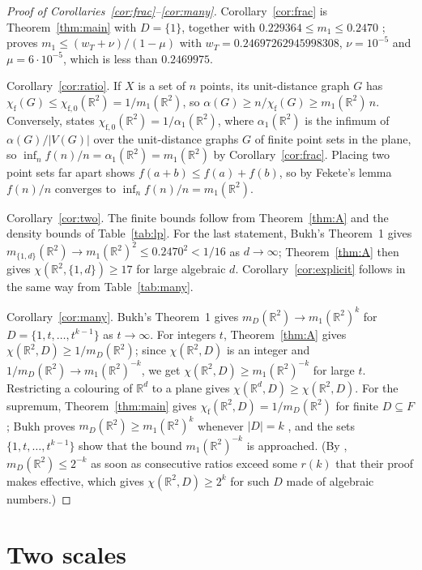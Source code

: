 \documentclass[11pt,a4paper]{amsart}
\theoremstyle{definition}
\theoremstyle{remark}
\newcommand{\R}{\mathbb{R}}
\newcommand{\chif}{\chi_{\mathrm f}}
\begin{document}
\begin{proof}[Proof of Corollaries~\ref{cor:frac}--\ref{cor:many}]
Corollary~\ref{cor:frac} is Theorem~\ref{thm:main} with $D=\{1\}$, together with $0.229364\le m_1\le0.2470$
\cite{Croft,ACMVZ}; \cite[§8]{ACMVZ} proves $m_1\le(w_T+\nu)/(1-\mu)$ with $w_T=0.24697262945998308$, $\nu=10^{-5}$
and $\mu=6\cdot10^{-5}$, which is less than $0.2469975$.

Corollary~\ref{cor:ratio}. If $X$ is a set of $n$ points, its unit-distance graph $G$ has
$\chif(G)\le\chi_{\mathrm f,0}(\R^2)=1/m_1(\R^2)$, so $\alpha(G)\ge n/\chif(G)\ge m_1(\R^2)\,n$. Conversely,
\cite[Thm.~2]{MRVZ} states $\chi_{\mathrm f,0}(\R^2)=1/\alpha_1(\R^2)$, where $\alpha_1(\R^2)$ is the infimum of
$\alpha(G)/|V(G)|$ over the unit-distance graphs $G$ of finite point sets in the plane, so
$\inf_nf(n)/n=\alpha_1(\R^2)=m_1(\R^2)$ by Corollary~\ref{cor:frac}. Placing two point
sets far apart shows $f(a+b)\le f(a)+f(b)$, so by Fekete's lemma $f(n)/n$ converges to $\inf_nf(n)/n=m_1(\R^2)$.

Corollary~\ref{cor:two}. The finite bounds follow from Theorem~\ref{thm:A} and the density bounds of
Table~\ref{tab:lp}. For the last statement, Bukh's Theorem~1 \cite{Bukh} gives
$m_{\{1,d\}}(\R^2)\to m_1(\R^2)^2\le0.2470^2<1/16$ as $d\to\infty$; Theorem~\ref{thm:A} then gives
$\chi(\R^2,\{1,d\})\ge17$ for large algebraic $d$. Corollary~\ref{cor:explicit} follows in the same way from
Table~\ref{tab:many}.

Corollary~\ref{cor:many}. Bukh's Theorem~1 gives $m_D(\R^2)\to m_1(\R^2)^k$ for $D=\{1,t,\dots,t^{k-1}\}$ as
$t\to\infty$. For integers $t$, Theorem~\ref{thm:A} gives $\chi(\R^2,D)\ge1/m_D(\R^2)$; since $\chi(\R^2,D)$ is an
integer and $1/m_D(\R^2)\to m_1(\R^2)^{-k}$, we get $\chi(\R^2,D)\ge m_1(\R^2)^{-k}$ for large $t$. Restricting a
colouring of $\R^d$ to a plane gives $\chi(\R^d,D)\ge\chi(\R^2,D)$. For the supremum, Theorem~\ref{thm:main} gives
$\chif(\R^2,D)=1/m_D(\R^2)$ for finite $D\subseteq F$; Bukh proves $m_D(\R^2)\ge m_1(\R^2)^k$ whenever $|D|=k$
\cite{Bukh}, and the sets $\{1,t,\dots,t^{k-1}\}$ show that the bound $m_1(\R^2)^{-k}$ is approached. (By
\cite[Thm.~5.1]{OFV}, $m_D(\R^2)\le2^{-k}$ as soon as consecutive ratios exceed some $r(k)$ that their proof makes
effective, which gives $\chi(\R^2,D)\ge2^k$ for such $D$ made of algebraic numbers.)
\end{proof}

\section{Two scales}\label{sec:scales}
\end{document}

